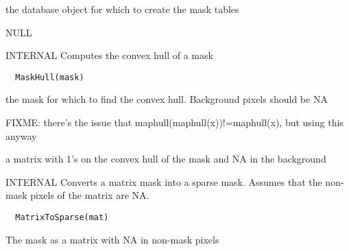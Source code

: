 \documentclass[a4paper]{book}
\begin{document}
%
\begin{Arguments}
\begin{ldescription}
\item[\code{db}] the database object for which to create the
mask tables
\end{ldescription}
\end{Arguments}
%
\begin{Value}
NULL
\end{Value}
%
\begin{Description}\relax
INTERNAL Computes the convex hull of a mask
\end{Description}
%
\begin{Usage}
\begin{verbatim}
  MaskHull(mask)
\end{verbatim}
\end{Usage}
%
\begin{Arguments}
\begin{ldescription}
\item[\code{mask}] the mask for which to find the convex hull.
Background pixels should be NA
\end{ldescription}
\end{Arguments}
%
\begin{Details}\relax
FIXME: there's the issue that
maphull(maphull(x))!=maphull(x), but using this anyway
\end{Details}
%
\begin{Value}
a matrix with 1's on the convex hull of the mask and NA
in the background
\end{Value}
%
\begin{Description}\relax
INTERNAL Converts a matrix mask into a sparse mask.
Assumes that the non-mask pixels of the matrix are NA.
\end{Description}
%
\begin{Usage}
\begin{verbatim}
  MatrixToSparse(mat)
\end{verbatim}
\end{Usage}
%
\begin{Arguments}
\begin{ldescription}
\item[\code{mat}] The mask as a matrix with NA in non-mask
pixels
\end{ldescription}
\end{Arguments}
\end{document}
